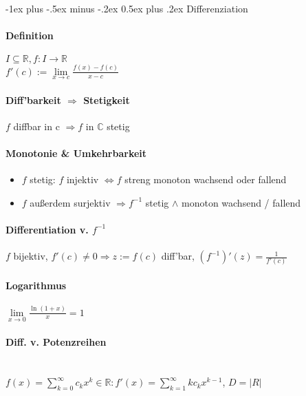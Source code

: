 \documentclass[paper=a3,paper=landscape, fontsize=9pt,DIV=25]{scrartcl}
\makeatletter
\newcommand{\real}{{\mathbb{R}}}
\newcommand{\compl}{\mathbb{C}}
\renewcommand{\section}{\@startsection{section}{1}{0mm}%
  {-1ex plus -.5ex minus -.2ex}%
  {0.5ex plus .2ex}%
  {\color{blue}\normalfont\large\bfseries}}
\makeatother
\begin{document}
\begin{multicols*}{4}
  \section{Differenziation}

  \paragraph{Definition}
  $I \subseteq \real, f: I \rightarrow \real$\\
$f'(c) := \lim\limits_{x \rightarrow c} \frac{f(x)-f(c)}{x-c}$

  \paragraph{Diff'barkeit $\Rightarrow$ Stetigkeit}
  $f$ diffbar in c $\Rightarrow f$ in $\compl$ stetig

  \paragraph{Monotonie \& Umkehrbarkeit}
  \begin{itemize}
  \item $f$ stetig: $f$ injektiv $\Leftrightarrow f$ streng monoton wachsend oder fallend
  \item $f$ außerdem surjektiv $\Rightarrow f^{-1}$ stetig $\wedge$ monoton wachsend / fallend
  \end{itemize}


  \paragraph{Differentiation v. $f^{-1}$}
  $f$ bijektiv, $f'(c) \neq 0 \Rightarrow z := f(c)$ diff'bar, $(f^{-1})'(z)=\frac{1}{f'(c)}$


  \paragraph{Logarithmus}
  $\lim\limits_{x\rightarrow0} \frac{\ln(1+x)}{x}=1$


  \paragraph{Diff. v. Potenzreihen}\hspace{0pt}\\
  $ f(x)=\sum_{k=0}^{\infty}c_kx^k \in \real: f'(x)=\sum_{k=1}^{\infty}kc_kx^{k-1}$, $D = \lvert R \rvert$



\end{multicols*}
\end{document}
